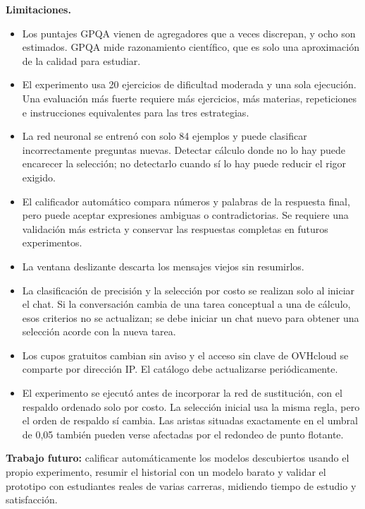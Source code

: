 \documentclass[12pt,letterpaper]{article}
\begin{document}
\textbf{Limitaciones.}
\begin{itemize}[nosep]
  \item Los puntajes GPQA vienen de agregadores que a veces discrepan, y ocho son estimados. GPQA mide razonamiento científico, que es solo una aproximación de la calidad para estudiar.
  \item El experimento usa 20 ejercicios de dificultad moderada y una sola ejecución. Una evaluación más fuerte requiere más ejercicios, más materias, repeticiones e instrucciones equivalentes para las tres estrategias.
  \item La red neuronal se entrenó con solo 84 ejemplos y puede clasificar incorrectamente preguntas nuevas. Detectar cálculo donde no lo hay puede encarecer la selección; no detectarlo cuando sí lo hay puede reducir el rigor exigido.
  \item El calificador automático compara números y palabras de la respuesta final, pero puede aceptar expresiones ambiguas o contradictorias. Se requiere una validación más estricta y conservar las respuestas completas en futuros experimentos.
  \item La ventana deslizante descarta los mensajes viejos sin resumirlos.
  \item La clasificación de precisión y la selección por costo se realizan solo al iniciar el chat. Si la conversación cambia de una tarea conceptual a una de cálculo, esos criterios no se actualizan; se debe iniciar un chat nuevo para obtener una selección acorde con la nueva tarea.
  \item Los cupos gratuitos cambian sin aviso y el acceso sin clave de OVHcloud se comparte por dirección IP. El catálogo debe actualizarse periódicamente.
  \item El experimento se ejecutó antes de incorporar la red de sustitución, con el respaldo ordenado solo por costo. La selección inicial usa la misma regla, pero el orden de respaldo sí cambia. Las aristas situadas exactamente en el umbral de 0,05 también pueden verse afectadas por el redondeo de punto flotante.
\end{itemize}

\textbf{Trabajo futuro:} calificar automáticamente los modelos descubiertos usando el propio experimento, resumir el historial con un modelo barato y validar el prototipo con estudiantes reales de varias carreras, midiendo tiempo de estudio y satisfacción.

\newpage
\printbibliography[title={Referencias}]
\end{document}
